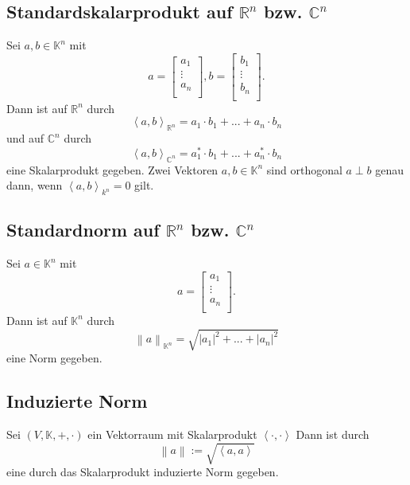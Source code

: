 \subsection{Standardskalarprodukt auf $\mathbb{R}^n$ bzw. $\mathbb{C}^n$}
Sei $a,b \in \mathbb{K}^n$ mit
\begin{displaymath}
    a=
    \begin{bmatrix}
        a_1 \\
        \vdots \\
        a_n \\
    \end{bmatrix}
    ,
    b=
    \begin{bmatrix}
        b_1 \\
        \vdots \\
        b_n \\
    \end{bmatrix}
    .
\end{displaymath}
Dann ist auf $\mathbb{R}^n$ durch
\begin{displaymath}
    \left< a,b \right>_{\mathbb{R}^n} = a_1 \cdot b_1 + ... + a_n \cdot b_n
\end{displaymath}
und auf $\mathbb{C}^n$ durch
\begin{displaymath}
    \left< a,b \right>_{\mathbb{C}^n} = a_1^* \cdot b_1 + ... + a_n^* \cdot b_n
\end{displaymath}
eine Skalarprodukt gegeben. Zwei Vektoren $a,b \in \mathbb{K}^n$ sind orthogonal $a \perp b$ genau dann, wenn $\left< a,b \right>_{k^n} = 0$ gilt.

\subsection{Standardnorm auf $\mathbb{R}^n$ bzw. $\mathbb{C}^n$}
Sei $a \in \mathbb{K}^n $ mit
\begin{displaymath}
    a = 
    \begin{bmatrix}
        a_1 \\
        \vdots \\
        a_n \\
    \end{bmatrix}
    .
\end{displaymath}
Dann ist auf $\mathbb{K}^n$ durch 
\begin{displaymath}
    \left\| a \right\|_{\mathbb{K}^n} = \sqrt{\left| a_1 \right|^2 + ... + \left| a_n \right|^2} 
\end{displaymath}
eine Norm gegeben.
\subsection{Induzierte Norm}
Sei $(V,\mathbb{K},+,\cdot)$ ein Vektorraum mit Skalarprodukt $\left< \cdot , \cdot \right>$ Dann ist durch
\begin{displaymath}
    \left\| a \right\| := \sqrt{\left< a , a \right>}
\end{displaymath}
eine durch das Skalarprodukt induzierte Norm gegeben.